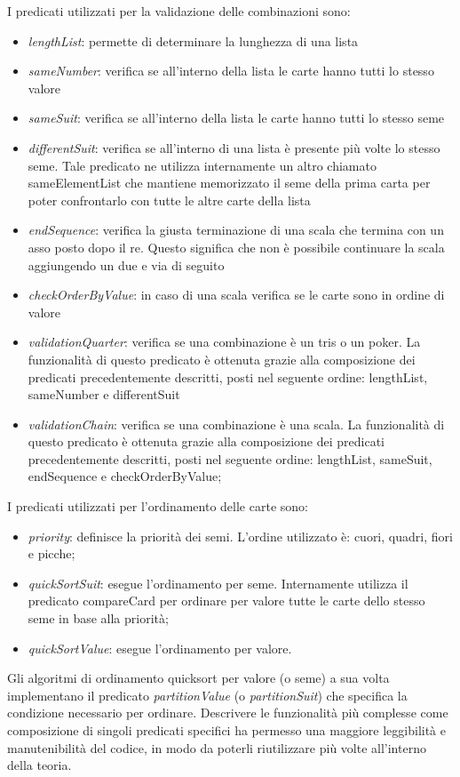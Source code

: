 I predicati utilizzati per la validazione delle combinazioni sono:
\begin{itemize}
    \item \textit{lengthList}: permette di determinare la lunghezza di una lista
    \item \textit{sameNumber}: verifica se all’interno della lista le carte hanno tutti lo stesso valore
    \item \textit{sameSuit}: verifica se all’interno della lista le carte hanno tutti lo stesso seme
    \item \textit{differentSuit}: verifica se all’interno di una lista è presente più volte lo stesso seme.
    Tale predicato ne utilizza internamente un altro chiamato sameElementList che mantiene memorizzato il seme della prima carta per poter confrontarlo con tutte le altre carte della lista
    \item \textit{endSequence}: verifica la giusta terminazione di una scala che termina con un asso posto dopo il re.
    Questo significa che non è possibile continuare la scala aggiungendo un due e via di seguito
    \item \textit{checkOrderByValue}: in caso di una scala verifica se le carte sono in ordine di valore
    \item \textit{validationQuarter}: verifica se una combinazione è un tris o un poker.
    La funzionalità di questo predicato è ottenuta grazie alla composizione dei predicati precedentemente descritti, posti nel seguente ordine: lengthList, sameNumber e differentSuit
    \item \textit{validationChain}: verifica se una combinazione è una scala.
    La funzionalità di questo predicato è ottenuta grazie alla composizione dei predicati precedentemente descritti, posti nel seguente ordine: lengthList, sameSuit, endSequence e checkOrderByValue;
\end{itemize}

I predicati utilizzati per l’ordinamento delle carte sono:
\begin{itemize}
    \item \textit{priority}: definisce la priorità dei semi.
    L’ordine utilizzato è: cuori, quadri, fiori e picche;
    \item \textit{quickSortSuit}: esegue l’ordinamento per seme.
    Internamente utilizza il predicato compareCard per ordinare per valore tutte le carte dello stesso seme in base alla priorità;
    \item \textit{quickSortValue}: esegue l’ordinamento per valore.
\end{itemize}
Gli algoritmi di ordinamento quicksort per valore (o seme) a sua volta implementano il predicato \textit{partitionValue} (o \textit{partitionSuit}) che specifica la condizione necessario per ordinare.
\newline \newline
Descrivere le funzionalità più complesse come composizione di singoli predicati specifici ha permesso una maggiore leggibilità e manutenibilità del codice, in modo da poterli riutilizzare più volte all’interno della teoria.

